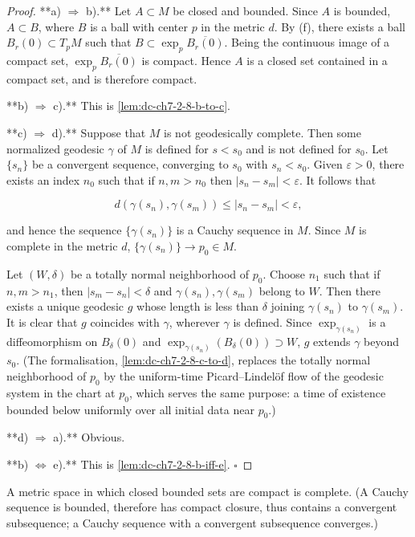 \begin{proof}
  **a) $\Rightarrow$ b).** Let $A\subset M$ be closed and bounded. Since $A$ is
  bounded, $A\subset B$, where $B$ is a ball with center $p$ in the metric $d$. By
  (f), there exists a ball $B_r(0)\subset T_pM$ such that
  $B\subset\exp_p\overline{B_r(0)}$. Being the continuous image of a compact set,
  $\exp_p\overline{B_r(0)}$ is compact. Hence $A$ is a closed set contained in a
  compact set, and is therefore compact.
  
  **b) $\Rightarrow$ c).** This is \cref{lem:dc-ch7-2-8-b-to-c}.
  
  **c) $\Rightarrow$ d).** Suppose that $M$ is not geodesically complete. Then some
  normalized geodesic $\gamma$ of $M$ is defined for $s<s_0$ and is not defined for
  $s_0$. Let $\{s_n\}$ be a convergent sequence, converging to $s_0$ with $s_n<s_0$.
  Given $\varepsilon>0$, there exists an index $n_0$ such that if $n,m>n_0$ then
  $|s_n-s_m|<\varepsilon$. It follows that
  
  $$
  d(\gamma(s_n),\gamma(s_m))\le|s_n-s_m|<\varepsilon,
  $$
  
  and hence the sequence $\{\gamma(s_n)\}$ is a Cauchy sequence in $M$. Since $M$ is
  complete in the metric $d$, $\{\gamma(s_n)\}\to p_0\in M$.
  
  Let $(W,\delta)$ be a totally normal neighborhood of $p_0$. Choose $n_1$ such that
  if $n,m>n_1$, then $|s_m-s_n|<\delta$ and $\gamma(s_n),\gamma(s_m)$ belong to $W$.
  Then there exists a unique geodesic $g$ whose length is less than $\delta$ joining
  $\gamma(s_n)$ to $\gamma(s_m)$. It is clear that $g$ coincides with $\gamma$,
  wherever $\gamma$ is defined. Since $\exp_{\gamma(s_n)}$ is a diffeomorphism on
  $B_\delta(0)$ and $\exp_{\gamma(s_n)}(B_\delta(0))\supset W$, $g$ extends $\gamma$
  beyond $s_0$. (The formalisation, \cref{lem:dc-ch7-2-8-c-to-d}, replaces the
  totally normal neighborhood of $p_0$ by the uniform-time Picard–Lindelöf flow of
  the geodesic system in the chart at $p_0$, which serves the same purpose: a time
  of existence bounded below uniformly over all initial data near $p_0$.)
  
  **d) $\Rightarrow$ a).** Obvious.

  **b) $\iff$ e).** This is \cref{lem:dc-ch7-2-8-b-iff-e}. $\square$
\end{proof}

\begin{lemma}
  \label{lem:dc-ch7-2-8-b-to-c}
  \mathlibok
  A metric space in which closed bounded sets are compact is complete. (A
  Cauchy sequence is bounded, therefore has compact closure, thus contains a
  convergent subsequence; a Cauchy sequence with a convergent subsequence
  converges.)
\end{lemma}

